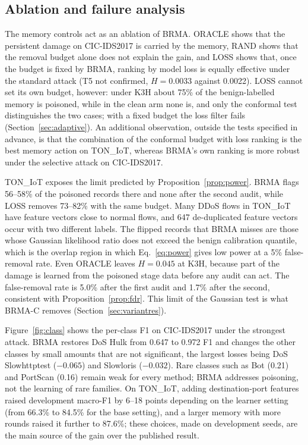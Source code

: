 \documentclass[pdflatex,sn-mathphys-num]{sn-jnl}
\theoremstyle{thmstyleone}
\theoremstyle{thmstylethree}
\begin{document}
\subsection{Ablation and failure analysis}\label{sec:ablation}
The memory controls act as an ablation of BRMA. ORACLE shows that the persistent damage on CIC-IDS2017 is carried by the memory, RAND shows that the removal budget alone does not explain the gain, and LOSS shows that, once the budget is fixed by BRMA, ranking by model loss is equally effective under the standard attack (T5 not confirmed, $H=0.0033$ against 0.0022). LOSS cannot set its own budget, however: under K3H about 75\% of the benign-labelled memory is poisoned, while in the clean arm none is, and only the conformal test distinguishes the two cases; with a fixed budget the loss filter fails (Section~\ref{sec:adaptive}). An additional observation, outside the tests specified in advance, is that the combination of the conformal budget with loss ranking is the best memory action on TON\_IoT, whereas BRMA's own ranking is more robust under the selective attack on CIC-IDS2017.

TON\_IoT exposes the limit predicted by Proposition~\ref{prop:power}. BRMA flags 56--58\% of the poisoned records there and none after the second audit, while LOSS removes 73--82\% with the same budget. Many DDoS flows in TON\_IoT have feature vectors close to normal flows, and 647 de-duplicated feature vectors occur with two different labels. The flipped records that BRMA misses are those whose Gaussian likelihood ratio does not exceed the benign calibration quantile, which is the overlap region in which Eq.~\eqref{eq:power} gives low power at a 5\% false-removal rate. Even ORACLE leaves $H=0.045$ at K3H, because part of the damage is learned from the poisoned stage data before any audit can act. The false-removal rate is 5.0\% after the first audit and 1.7\% after the second, consistent with Proposition~\ref{prop:fdr}. This limit of the Gaussian test is what BRMA-C removes (Section~\ref{sec:variantres}).

Figure~\ref{fig:class} shows the per-class F1 on CIC-IDS2017 under the strongest attack. BRMA restores DoS Hulk from 0.647 to 0.972 F1 and changes the other classes by small amounts that are not significant, the largest losses being DoS Slowhttptest ($-0.065$) and Slowloris ($-0.032$). Rare classes such as Bot (0.21) and PortScan (0.16) remain weak for every method; BRMA addresses poisoning, not the learning of rare families. On TON\_IoT, adding destination-port features raised development macro-F1 by 6--18 points depending on the learner setting (from 66.3\% to 84.5\% for the base setting), and a larger memory with more rounds raised it further to 87.6\%; these choices, made on development seeds, are the main source of the gain over the published result.
\end{document}
